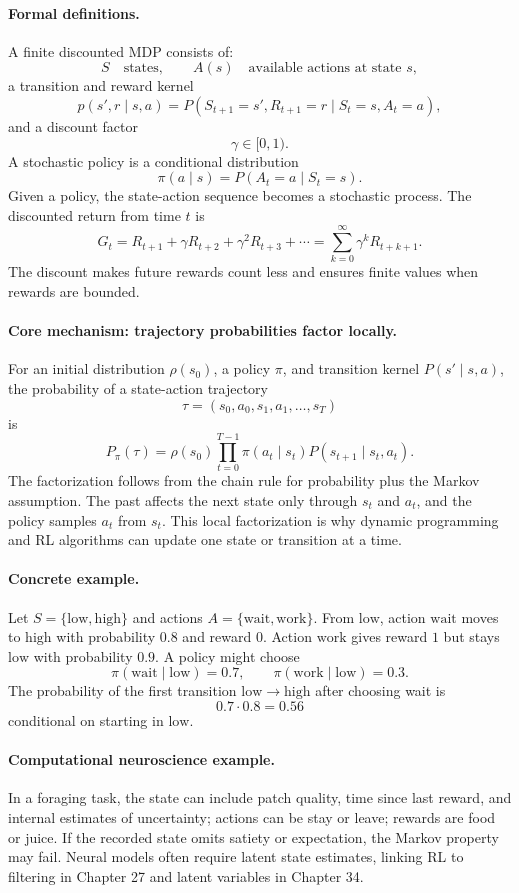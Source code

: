 \paragraph{Formal definitions.}
A finite discounted MDP consists of:
\[
S \quad \text{states},\qquad A(s) \quad \text{available actions at state }s,
\]
a transition and reward kernel
\[
p(s',r\mid s,a)
=P(S_{t+1}=s',R_{t+1}=r\mid S_t=s,A_t=a),
\]
and a discount factor
\[
\gamma\in[0,1).
\]
A stochastic policy is a conditional distribution
\[
\pi(a\mid s)=P(A_t=a\mid S_t=s).
\]
Given a policy, the state-action sequence becomes a stochastic process. The discounted return from time \(t\) is
\[
\boxed{
G_t=R_{t+1}+\gamma R_{t+2}+\gamma^2R_{t+3}+\cdots
=\sum_{k=0}^{\infty}\gamma^k R_{t+k+1}.
}
\]
The discount makes future rewards count less and ensures finite values when rewards are bounded.

\paragraph{Core mechanism: trajectory probabilities factor locally.}
For an initial distribution \(\rho(s_0)\), a policy \(\pi\), and transition kernel \(P(s'\mid s,a)\), the probability of a state-action trajectory
\[
\tau=(s_0,a_0,s_1,a_1,\ldots,s_T)
\]
is
\[
\boxed{
P_\pi(\tau)
=\rho(s_0)\prod_{t=0}^{T-1}\pi(a_t\mid s_t)P(s_{t+1}\mid s_t,a_t).
}
\]
The factorization follows from the chain rule for probability plus the Markov assumption. The past affects the next state only through \(s_t\) and \(a_t\), and the policy samples \(a_t\) from \(s_t\). This local factorization is why dynamic programming and RL algorithms can update one state or transition at a time.

\paragraph{Concrete example.}
Let \(S=\{\mathrm{low},\mathrm{high}\}\) and actions \(A=\{\mathrm{wait},\mathrm{work}\}\). From \(\mathrm{low}\), action \(\mathrm{wait}\) moves to \(\mathrm{high}\) with probability \(0.8\) and reward \(0\). Action \(\mathrm{work}\) gives reward \(1\) but stays \(\mathrm{low}\) with probability \(0.9\). A policy might choose
\[
\pi(\mathrm{wait}\mid\mathrm{low})=0.7,\qquad
\pi(\mathrm{work}\mid\mathrm{low})=0.3.
\]
The probability of the first transition \(\mathrm{low}\to\mathrm{high}\) after choosing wait is
\[
0.7\cdot0.8=0.56
\]
conditional on starting in \(\mathrm{low}\).

\paragraph{Computational neuroscience example.}
In a foraging task, the state can include patch quality, time since last reward, and internal estimates of uncertainty; actions can be stay or leave; rewards are food or juice. If the recorded state omits satiety or expectation, the Markov property may fail. Neural models often require latent state estimates, linking RL to filtering in Chapter 27 and latent variables in Chapter 34.

